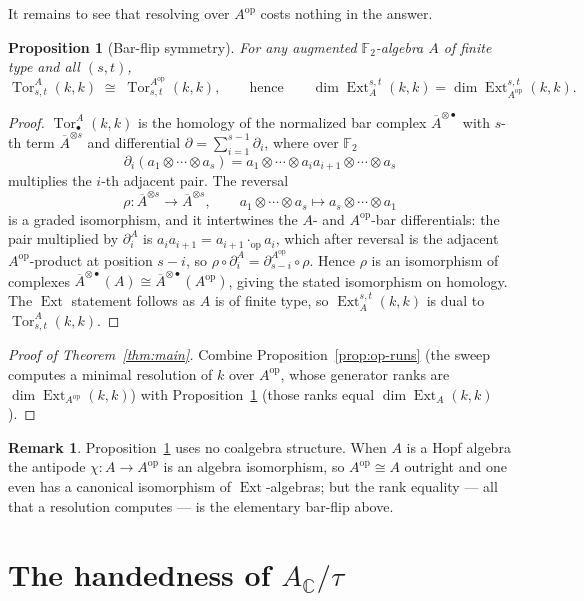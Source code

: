 \documentclass[11pt]{article}
\newtheorem{proposition}[theorem]{Proposition}
\theoremstyle{definition}
\newtheorem{remark}[theorem]{Remark}
\DeclareMathOperator{\Ext}{Ext}
\DeclareMathOperator{\Tor}{Tor}
\DeclareMathOperator{\op}{op}
\newcommand{\F}{\mathbb{F}}
\newcommand{\Actau}{A_{\mathbb C}/\tau}
\newcommand{\barA}{\overline{A}}
\newcommand{\Aop}{A^{\op}}
\begin{document}
It remains to see that resolving over $\Aop$ costs nothing in the answer.

\begin{proposition}[Bar-flip symmetry]\label{prop:tor}
For any augmented $\F_2$-algebra $A$ of finite type and all $(s,t)$,
\[
  \Tor^{A}_{s,t}(k,k)\;\cong\;\Tor^{\Aop}_{s,t}(k,k),
  \qquad\text{hence}\qquad
  \dim\Ext^{s,t}_{A}(k,k)=\dim\Ext^{s,t}_{\Aop}(k,k).
\]
\end{proposition}

\begin{proof}
$\Tor^A_\bullet(k,k)$ is the homology of the normalized bar complex $\barA^{\otimes
\bullet}$ with $s$-th term $\barA^{\otimes s}$ and differential
$\partial=\sum_{i=1}^{s-1}\partial_i$, where over $\F_2$
\[
  \partial_i(a_1\otimes\cdots\otimes a_s)
  = a_1\otimes\cdots\otimes a_ia_{i+1}\otimes\cdots\otimes a_s
\]
multiplies the $i$-th adjacent pair. The reversal
\[
  \rho\colon \barA^{\otimes s}\to\barA^{\otimes s},\qquad
  a_1\otimes\cdots\otimes a_s\longmapsto a_s\otimes\cdots\otimes a_1
\]
is a graded isomorphism, and it intertwines the $A$- and $\Aop$-bar differentials:
the pair multiplied by $\partial_i^A$ is $a_ia_{i+1}=a_{i+1}\cdot_{\op}a_i$, which
after reversal is the adjacent $\Aop$-product at position $s-i$, so
$\rho\circ\partial_i^A=\partial_{s-i}^{\Aop}\circ\rho$. Hence $\rho$ is an
isomorphism of complexes $\barA^{\otimes\bullet}(A)\cong\barA^{\otimes\bullet}
(\Aop)$, giving the stated isomorphism on homology. The $\Ext$ statement follows as
$A$ is of finite type, so $\Ext^{s,t}_A(k,k)$ is dual to $\Tor^A_{s,t}(k,k)$.
\end{proof}

\begin{proof}[Proof of Theorem~\ref{thm:main}]
Combine Proposition~\ref{prop:op-runs} (the sweep computes a minimal resolution of
$k$ over $\Aop$, whose generator ranks are $\dim\Ext_{\Aop}(k,k)$) with
Proposition~\ref{prop:tor} (those ranks equal $\dim\Ext_A(k,k)$).
\end{proof}

\begin{remark}
Proposition~\ref{prop:tor} uses no coalgebra structure. When $A$ is a Hopf algebra
the antipode $\chi\colon A\to\Aop$ is an algebra isomorphism, so $\Aop\cong A$
outright and one even has a canonical isomorphism of $\Ext$-algebras; but the rank
equality --- all that a resolution computes --- is the elementary bar-flip above.
\end{remark}

\section{The handedness of $\Actau$}\label{sec:handedness}
\end{document}
